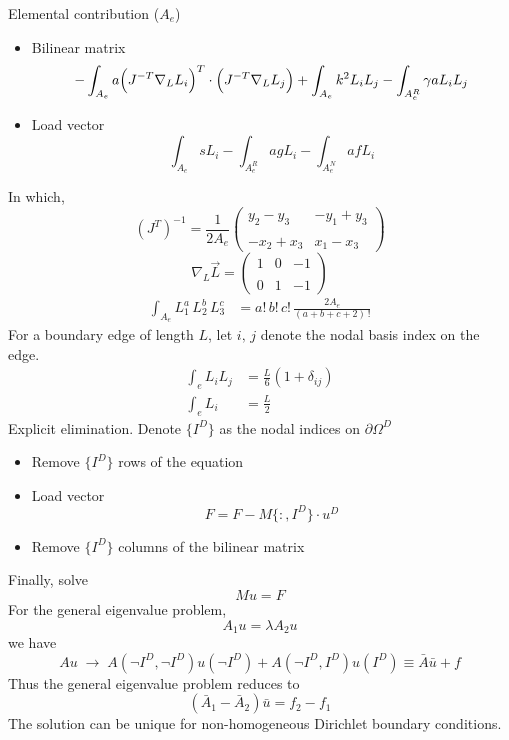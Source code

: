 \documentclass[a4paper,onecolumn]{article}
\begin{document}
\noindent Elemental contribution ($A_e$)
\begin{itemize}
    \item Bilinear matrix
    \begin{equation*}
        -\int_{A_e}  a \Bigl( J^{-T} \nabla_L L_i \Bigr)^T \cdot \Bigl(J^{-T}\nabla_L L_j\Bigr)
        + \int_{A_e} k^2 L_i L_j - \int_{A_e^R} \gamma a L_i L_j
    \end{equation*}
    \item Load vector
    \begin{equation*}
        \int_{A_e} s L_i - \int_{A_e^R} a g L_i - \int_{A_e^N} a f L_i
    \end{equation*}
\end{itemize}
In which,
\begin{equation}
(J^T)^{-1}=\frac{1}{2A_e}
\begin{pmatrix}
y_2-y_3 & -y_1+y_3\\
\\
-x_2+x_3 & x_1-x_3
\end{pmatrix}
\end{equation}
\begin{equation}
\nabla_L \vec{L}=
\begin{pmatrix}
1 & 0 & -1\\
\\
0 & 1 & -1
\end{pmatrix}
\end{equation}
\begin{equation}\begin{split}
\int_{A_e}\! L_1^a\, L_2^b\, L_3^c&=a!\,b!\,c!\,\frac{2A_e}{(a+b+c+2)\,!}
\end{split}\end{equation}
\noindent For a boundary edge of length $L$, let $i,\,j$ denote the nodal basis index on the edge.
\begin{equation*}\begin{split}
    \int_e L_i L_j &= \frac{L}{6}(1+\delta_{ij})\\
    \int_e L_i &= \frac{L}{2}
\end{split}\end{equation*}
Explicit elimination. Denote $\{I^D\}$ as the nodal indices on $\partial \Omega^D$
\begin{itemize}
    \item Remove $\{I^D\}$ rows of the equation
    \item Load vector
          $$
              F = F - M{\{:,I^D\}} \cdot u^{D}
          $$
    \item Remove $\{I^D\}$ columns of the bilinear matrix
\end{itemize}
Finally, solve
$$
    Mu = F
$$
For the general eigenvalue problem,
$$
    A_1 u = \lambda A_2 u
$$
we have
$$
    A u \;\rightarrow\; A(\neg I^D, \neg I^D) u(\neg I^D) + A(\neg I^D, I^D) u(I^D) \equiv \bar{A}\bar{u}+f
$$
Thus the general eigenvalue problem reduces to
$$
    \left( \bar{A}_1 - \bar{A}_2 \right) \bar{u} = f_2 - f_1
$$
The solution can be unique for non-homogeneous Dirichlet boundary conditions.
\end{document}
